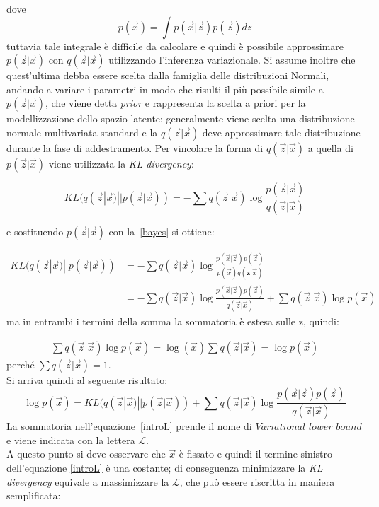 dove
\begin{equation}
	p(\vec{x}) = \int p(\vec{x}|\vec{z}) p(\vec{z}) dz
	\label{integrale}
\end{equation}
tuttavia tale integrale è difficile da calcolare e quindi è possibile approssimare $p(\vec{z}|\vec{x})$ con $q(\vec{z}|\vec{x})$ utilizzando l'inferenza variazionale. Si assume inoltre che quest'ultima debba essere scelta dalla famiglia delle distribuzioni Normali, andando a variare i parametri in modo che risulti il più possibile simile a $p(\vec{z}|\vec{x})$, che viene detta \textit{prior} e rappresenta la scelta a priori per la modellizzazione dello spazio latente; generalmente viene scelta una distribuzione normale multivariata standard e la $q(\vec{z}|\vec{x})$ deve approssimare tale distribuzione durante la fase di addestramento. Per vincolare la forma di $q(\vec{z}|\vec{x})$ a quella di $p(\vec{z}|\vec{x})$ viene utilizzata la \textit{KL divergency}: 


\begin{equation}
	KL (q(\vec{z}|\vec{x}) || p(\vec{z}|\vec{x})) = -\sum q(\vec{z}|\vec{x}) \log \frac{p(\vec{z}|\vec{x})}{q(\vec{z}|\vec{x})}
\end{equation}

e sostituendo $p(\vec{z}|\vec{x})$ con la~\ref{bayes} si ottiene:


\begin{align*} 
	KL (q(\vec{z}|\vec{x}) || p(\vec{z}|\vec{x})) &=  -\sum q(\vec{z}|\vec{x}) \log \frac{p(\vec{x}|\vec{z})p(\vec{z})}{p(\vec{x})q(\textbf{z}|\vec{x})} \\ &=  -\sum q(\vec{z}|\vec{x})\log \frac{p(\vec{x}|\vec{z})p(\vec{z})}{q(\vec{z}|\vec{x})} + \sum q(\vec{z}|\vec{x})\log p(\vec{x})
\end{align*}
ma in entrambi i termini della somma la sommatoria è estesa sulle z, quindi:

\begin{align*}
	\sum q(\vec{z}|\vec{x})\log p(\vec{x}) =
	\log (\vec{x}) \sum q(\vec{z}|\vec{x}) =
	\log p(\vec{x})
\end{align*}
perché $\sum q(\vec{z}|\vec{x})=1$. \\
Si arriva quindi al seguente risultato:
\begin{equation}
	\log p(\vec{x}) = KL (q(\vec{z}|\vec{x}) || p(\vec{z}|\vec{x})) + \sum q(\vec{z}|\vec{x}) \log \frac{p(\vec{x}|\vec{z})p(\vec{z})}{q(\vec{z}|\vec{x})}
	\label{introL}
\end{equation}
La sommatoria nell'equazione~\ref{introL} prende il nome di $\textit{Variational lower bound}$ e viene indicata con la lettera $\mathcal{L}$. \\
A questo punto si deve osservare che $\vec{x}$ è fissato e quindi il termine sinistro dell'equazione \ref{introL} è una costante; di conseguenza minimizzare la \textit{KL divergency} equivale a massimizzare la $\mathcal{L}$, che può essere riscritta in maniera semplificata:

